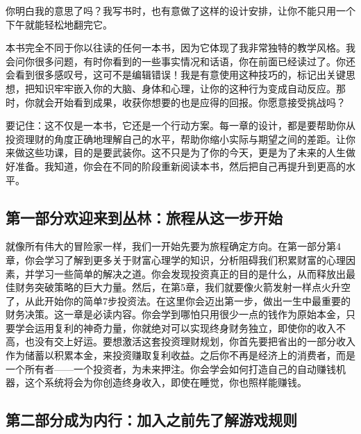 你明白我的意思了吗？我写书时，也有意做了这样的设计安排，让你不能只用一个下午就能轻松地翻完它。

本书完全不同于你以往读的任何一本书，因为它体现了我非常独特的教学风格。我会问你很多问题，有时你看到的一些事实情况和话语，你在前面已经读过了。你还会看到很多感叹号，这可不是编辑错误！我是有意使用这种技巧的，标记出关键思想，把知识牢牢嵌入你的大脑、身体和心理，让你的这种行为变成自动反应。那时，你就会开始看到成果，收获你想要的也是应得的回报。你愿意接受挑战吗？

要记住：这不仅是一本书，它还是一个行动方案。每一章的设计，都是要帮助你从投资理财的角度正确地理解自己的水平，帮助你缩小实际与期望之间的差距。让你来做这些功课，目的是要武装你。这不只是为了你的今天，更是为了未来的人生做好准备。我知道，你会在不同的阶段重新阅读本书，然后把自己再提升到更高的水平。

\subsection{第一部分\q 欢迎来到丛林：旅程从这一步开始}

就像所有伟大的冒险家一样，我们一开始先要为旅程确定方向。在第一部分第4章，你会学习了解到更多关于财富心理学的知识，分析阻碍我们积累财富的心理因素，并学习一些简单的解决之道。你会发现投资真正的目的是什么，从而释放出最佳财务突破策略的巨大力量。然后，在第5章，我们就要像火箭发射一样点火升空了，从此开始你的简单7步投资法。在这里你会迈出第一步，做出一生中最重要的财务决策。这一章是必读内容。你会学到哪怕只用很少一点的钱作为原始本金，只要学会运用复利的神奇力量，你就绝对可以实现终身财务独立，即使你的收入不高，也没有交上好运。要想激活这套投资理财规划，你首先要把省出的一部分收入作为储蓄以积累本金，来投资赚取复利收益。之后你不再是经济上的消费者，而是一个所有者——一个投资者，为未来押注。你会学会如何打造自己的自动赚钱机器，这个系统将会为你创造终身收入，即使在睡觉，你也照样能赚钱。

\subsection{第二部分\q 成为内行：加入之前先了解游戏规则}

